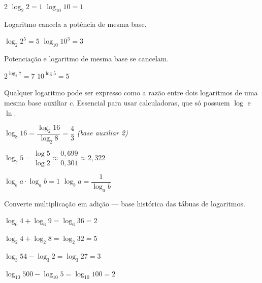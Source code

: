 \documentclass[12pt]{article}
\begin{document}
\begin{multicols}{2}
$\log_2 2 = 1$ \qquad $\log_{10} 10 = 1$


Logaritmo cancela a potência de mesma base.

$\log_2 2^5 = 5$ \qquad $\log_{10} 10^3 = 3$


Potenciação e logaritmo de mesma base se cancelam.

$2^{\log_2 7} = 7$ \qquad $10^{\log 5} = 5$


Qualquer logaritmo pode ser expresso como a razão entre dois logaritmos de uma mesma base auxiliar $c$. Essencial para usar calculadoras, que só possuem $\log$ e $\ln$.



$\log_8 16 = \dfrac{\log_2 16}{\log_2 8} = \dfrac{4}{3}$ \hfill {\small\textit{(base auxiliar 2)}}

\vspace{6px}

$\log_2 5 = \dfrac{\log 5}{\log 2} \approx \dfrac{0{,}699}{0{,}301} \approx 2{,}322$


$\log_b a \cdot \log_a b = 1$ \qquad $\log_b a = \dfrac{1}{\log_a b}$




Converte multiplicação em adição — base histórica das tábuas de logaritmos.

$\log_6 4 + \log_6 9 = \log_6 36 = 2$

$\log_2 4 + \log_2 8 = \log_2 32 = 5$



$\log_3 54 - \log_3 2 = \log_3 27 = 3$

$\log_{10} 500 - \log_{10} 5 = \log_{10} 100 = 2$




\end{multicols}
\end{document}
